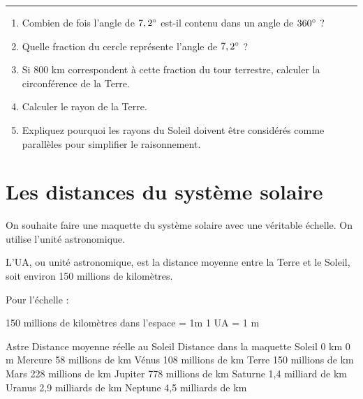 \hrule

\begin{enumerate}
  \item[1.] Combien de fois l'angle de $7,2\degree$ est-il contenu dans un angle de $360\degree$ ?
  \item[2.] Quelle fraction du cercle représente l'angle de $7,2\degree$ ?
  \item[3.] Si $800$ km correspondent à cette fraction du tour terrestre, calculer la circonférence de la Terre.
  \item[4.] Calculer le rayon de la Terre.
  \item[5.] Expliquez pourquoi les rayons du Soleil doivent être considérés comme parallèles pour simplifier le raisonnement.
\end{enumerate}

\newpage

\section*{Les distances du système solaire}

On souhaite faire une maquette du système solaire avec une véritable échelle. On utilise l'unité astronomique. 

L'UA, ou unité astronomique, est la distance moyenne entre la Terre et le Soleil, soit environ 150 millions de kilomètres.

Pour l'échelle : 

150 millions de kilomètres dans l'espace = 1m
1 UA = 1 m

Astre	Distance moyenne réelle au Soleil	Distance dans la maquette
Soleil	0 km	0 m
Mercure	58 millions de km	
Vénus	108 millions de km	
Terre	150 millions de km	
Mars	228 millions de km	
Jupiter	778 millions de km	
Saturne	1,4 milliard de km	
Uranus	2,9 milliards de km	
Neptune	4,5 milliards de km	




